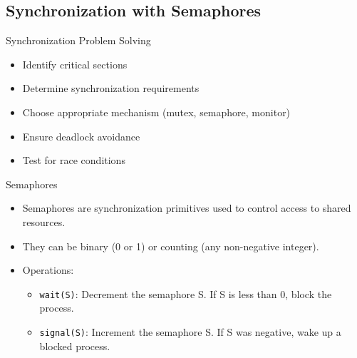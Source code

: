\raggedcolumns
\columnbreak

\subsection{Synchronization with Semaphores}

\begin{KR}{Synchronization Problem Solving}
    \begin{itemize}
        \item Identify critical sections
        \item Determine synchronization requirements
        \item Choose appropriate mechanism (mutex, semaphore, monitor)
        \item Ensure deadlock avoidance
        \item Test for race conditions
    \end{itemize}
\end{KR}


\begin{concept}{Semaphores}
    \begin{itemize}
        \item Semaphores are synchronization primitives used to control access to shared resources.
        \item They can be binary (0 or 1) or counting (any non-negative integer).
        \item Operations: 
            \begin{itemize}
                \item \texttt{wait(S)}: Decrement the semaphore S. If S is less than 0, block the process.
                \item \texttt{signal(S)}: Increment the semaphore S. If S was negative, wake up a blocked process.
            \end{itemize}
    \end{itemize}
\end{concept}

